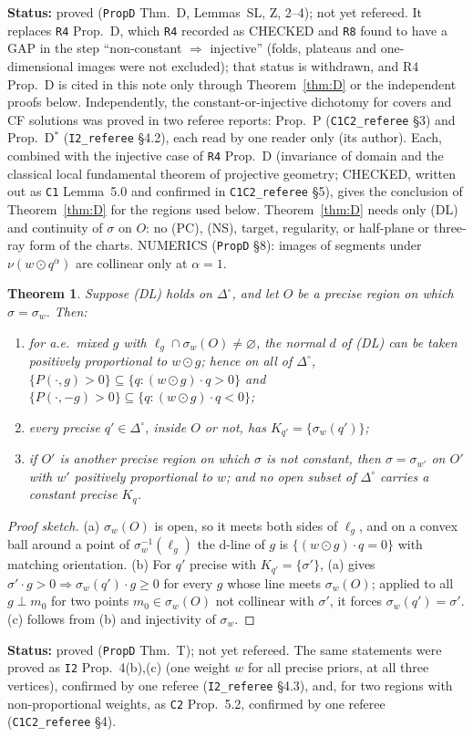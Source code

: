 \documentclass[11pt]{article}
\newtheorem{theorem}{Theorem}[section]
\theoremstyle{definition}
\theoremstyle{remark}
\newcommand{\Di}{\Delta^{\circ}}
\newcommand{\src}[1]{\texttt{#1}}
\newcommand{\status}[1]{\par\smallskip\noindent\textbf{Status:} #1\par\smallskip}
\begin{document}
\status{proved (\src{PropD} Thm.~D, Lemmas~SL, Z, 2--4); not yet refereed. It replaces \src{R4} Prop.~D, which \src{R4} recorded as CHECKED and \src{R8} found to have a GAP in the step ``non-constant $\Rightarrow$ injective'' (folds, plateaus and one-dimensional images were not excluded); that status is withdrawn, and R4 Prop.~D is cited in this note only through Theorem~\ref{thm:D} or the independent proofs below. Independently, the constant-or-injective dichotomy for covers and CF solutions was proved in two referee reports: Prop.~P (\src{C1C2\_referee} \S3) and Prop.~D$^*$ (\src{I2\_referee} \S4.2), each read by one reader only (its author). Each, combined with the injective case of \src{R4} Prop.~D (invariance of domain and the classical local fundamental theorem of projective geometry; CHECKED, written out as \src{C1} Lemma~5.0 and confirmed in \src{C1C2\_referee} \S5), gives the conclusion of Theorem~\ref{thm:D} for the regions used below. Theorem~\ref{thm:D} needs only (DL) and continuity of $\sigma$ on $O$: no (PC), (NS), target, regularity, or half-plane or three-ray form of the charts. NUMERICS (\src{PropD} \S8): images of segments under $\nu(w\odot q^\alpha)$ are collinear only at $\alpha=1$.}

\begin{theorem}\label{thm:T}
Suppose (DL) holds on $\Di$, and let $O$ be a precise region on which $\sigma=\sigma_w$. Then:
\begin{enumerate}[leftmargin=*,label=(\alph*)]
\item for a.e.\ mixed $g$ with $\ell_g\cap\sigma_w(O)\ne\varnothing$, the normal $d$ of (DL) can be taken positively proportional to $w\odot g$; hence on all of $\Di$, $\{P(\cdot,g)>0\}\subseteq\{q:(w\odot g)\cdot q>0\}$ and $\{P(\cdot,-g)>0\}\subseteq\{q:(w\odot g)\cdot q<0\}$;
\item every precise $q'\in\Di$, inside $O$ or not, has $K_{q'}=\{\sigma_w(q')\}$;
\item if $O'$ is another precise region on which $\sigma$ is not constant, then $\sigma=\sigma_{w'}$ on $O'$ with $w'$ positively proportional to $w$; and no open subset of $\Di$ carries a constant precise $K_q$.
\end{enumerate}
\end{theorem}
\begin{proof}[Proof sketch]
(a) $\sigma_w(O)$ is open, so it meets both sides of $\ell_g$, and on a convex ball around a point of $\sigma_w^{-1}(\ell_g)$ the d-line of $g$ is $\{(w\odot g)\cdot q=0\}$ with matching orientation. (b) For $q'$ precise with $K_{q'}=\{\sigma'\}$, (a) gives $\sigma'\cdot g>0\Rightarrow\sigma_w(q')\cdot g\ge0$ for every $g$ whose line meets $\sigma_w(O)$; applied to all $g\perp m_0$ for two points $m_0\in\sigma_w(O)$ not collinear with $\sigma'$, it forces $\sigma_w(q')=\sigma'$. (c) follows from (b) and injectivity of $\sigma_w$.
\end{proof}
\status{proved (\src{PropD} Thm.~T); not yet refereed. The same statements were proved as \src{I2} Prop.~4(b),(c) (one weight $w$ for all precise priors, at all three vertices), confirmed by one referee (\src{I2\_referee} \S4.3), and, for two regions with non-proportional weights, as \src{C2} Prop.~5.2, confirmed by one referee (\src{C1C2\_referee} \S4).}
\end{document}

